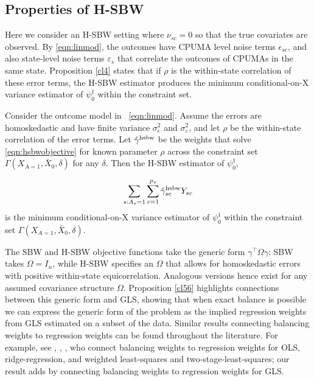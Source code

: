 \subsection{Properties of H-SBW}\label{app:AsecII}

Here we consider an H-SBW setting where $\nu_{sc}=0$ so that the true covariates are observed. By \eqref{eqn:linmod}, the outcomes have CPUMA level noise terms  $\epsilon_{sc}$, and also state-level noise terms $\varepsilon_s$ that correlate the outcomes of CPUMAs in the same state. Proposition \ref{cl4} states that if $\rho$ is the within-state correlation of these error terms, the H-SBW estimator produces the minimum conditional-on-X variance estimator of $\psi_0^1$ within the constraint set.

\begin{proposition}\label{cl4}
    Consider the outcome model in ~\eqref{eqn:linmod}. Assume the errors are homoskedastic and have finite variance $\sigma^2_{\epsilon}$ and $\sigma^2_{\varepsilon}$, and let $\rho$ be the within-state correlation of the error terms. Let $\hat{\gamma}^{\textup{hsbw}}$ be the weights that solve \eqref{eqn:hsbwobjective} for known parameter $\rho$ across the constraint set $\Gamma(X_{A=1}, \bar{X}_0, \delta)$ for any $\delta$. Then the H-SBW estimator of $\psi_0^1$,

    \[\sum_{s: A_s = 1}\sum_{c=1}^{p_s}\hat{\gamma}_{sc}^{\textup{hsbw}}Y_{sc}\] 
    is the minimum conditional-on-X variance estimator of $\psi_0^1$ within the constraint set $\Gamma(X_{A=1}, \bar{X}_0, \delta)$.
\end{proposition}

The SBW and H-SBW objective functions take the generic form $\gamma^\top\Omega\gamma$: SBW takes $\Omega = I_n$, while H-SBW specifies an $\Omega$ that allows for homoskedastic errors with positive within-state equicorrelation. Analogous versions hence exist for any assumed covariance structure $\Omega$. Proposition \ref{cl56} highlights connections between this generic form and GLS, showing that when exact balance is possible we can express the generic form of the problem as the implied regression weights from GLS estimated on a subset of the data. Similar results connecting balancing weights to regression weights can be found throughout the literature. For example, see \cite{kline2011oaxaca}, \cite{ben2021augmented}, \cite{chattopadhyay2021implied}, who connect balancing weights to regression weights for OLS, ridge-regression, and weighted least-squares and two-stage-least-squares; our result adds by connecting balancing weights to regression weights for GLS.

